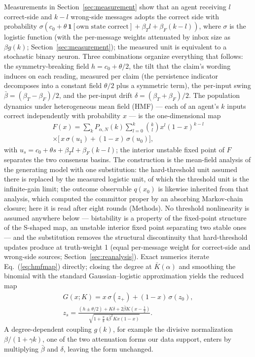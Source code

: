 \documentclass[9pt,twocolumn]{extarticle}
\begin{document}
Measurements in Section~\ref{sec:measurement} show that an agent receiving $l$
correct-side and $k-l$ wrong-side messages adopts the correct side with
probability
$\sigma(c_0 + \theta\,\mathbf{1}[\text{own state correct}] + \beta_T l +
\beta_F (k-l))$, where $\sigma$ is the logistic function (with the per-message weights attenuated by inbox size as $\beta g(k)$; Section~\ref{sec:measurement}); the measured unit is equivalent to a stochastic binary neuron. Three combinations
organize everything that follows: the symmetry-breaking field
$h = c_0 + \theta/2$, the tilt that the claim's wording induces on each
reading, measured per claim (the persistence indicator decomposes into a
constant field $\theta/2$ plus a symmetric term), the per-input swing
$\bar\beta = (\beta_T - \beta_F)/2$, and the per-input drift
$\delta = (\beta_T + \beta_F)/2$.
The population dynamics under heterogeneous mean field (HMF) --- each of an
agent's $k$ inputs correct independently with probability $x$ --- is the
one-dimensional map
\begin{multline}
F(x) = \sum_{k} P_{\alpha,N}(k) \sum_{l=0}^{k} \binom{k}{l}
x^{l} (1-x)^{k-l} \\ \times \bigl[\, x\,\sigma(u_{1}) + (1-x)\,\sigma(u_{0})
\bigr],
\label{eq:hmfmap}
\end{multline}
with $u_{s} = c_0 + \theta s + \beta_T l + \beta_F (k-l)$; the interior
unstable fixed point of $F$ separates the two consensus basins. The
construction is the mean-field analysis of the generating model
\citep{SciRepCrowding} with one substitution: the hard-threshold unit
assumed there is replaced by the measured logistic unit, of which the
threshold unit is the infinite-gain limit; the outcome observable
$q(x_0)$ is likewise inherited from that analysis, which computed the
committor proper by an absorbing Markov-chain closure; here it is read after
eight rounds (Methods). No threshold
nonlinearity is assumed anywhere below --- bistability is a property of the
fixed-point structure of the S-shaped map, an unstable interior fixed point
separating two stable ones --- and the substitution
removes the structural discontinuity that hard-threshold updates produce at truth-weight 1 (equal per-message weight for correct-side and wrong-side sources; Section~\ref{sec:reanalysis}). Exact numerics iterate
Eq.~(\ref{eq:hmfmap}) directly; closing the degree at $\bar K(\alpha)$ and
smoothing the binomial with the standard Gaussian--logistic approximation
yields the reduced map
\begin{gather}
G(x;K) = x\,\sigma(z_+) + (1-x)\,\sigma(z_0), \nonumber\\
z_s = \frac{(h \pm \theta/2) + K\delta + 2\bar\beta K (x - \tfrac12)}
{\sqrt{1 + \tfrac{\pi}{8}\, 4\bar\beta^2 K x(1-x)}}.
\end{gather}
A degree-dependent coupling $g(k)$, for example the divisive normalization
$\beta/(1+\gamma k)$, one of the two attenuation forms our data support,
enters by multiplying $\bar\beta$ and $\delta$, leaving the form unchanged.
\end{document}
